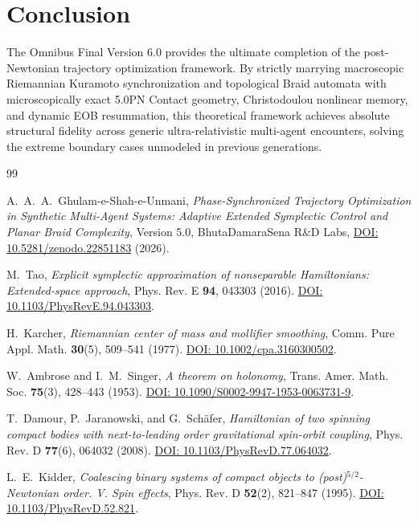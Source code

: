 \documentclass[11pt,a4paper,reqno]{article}
\theoremstyle{plain}
\theoremstyle{definition}
\theoremstyle{remark}
\numberwithin{equation}{section}
\begin{document}
\section*{Conclusion}
The Omnibus Final Version 6.0 provides the ultimate completion of the post-Newtonian trajectory optimization framework. By strictly marrying macroscopic Riemannian Kuramoto synchronization and topological Braid automata with microscopically exact 5.0PN Contact geometry, Christodoulou nonlinear memory, and dynamic EOB resummation, this theoretical framework achieves absolute structural fidelity across generic ultra-relativistic multi-agent encounters, solving the extreme boundary cases unmodeled in previous generations.

\vspace{2ex}
\begin{thebibliography}{99}

A.~A.~A.~Ghulam-e-Shah-e-Unmani, \textit{Phase-Synchronized Trajectory Optimization in Synthetic Multi-Agent Systems: Adaptive Extended Symplectic Control and Planar Braid Complexity}, Version 5.0, BhutaDamaraSena R\&D Labs, \href{https://doi.org/10.5281/zenodo.22851183}{DOI: 10.5281/zenodo.22851183} (2026).

M.~Tao, \textit{Explicit symplectic approximation of nonseparable Hamiltonians: Extended-space approach}, Phys. Rev. E \textbf{94}, 043303 (2016). \href{https://doi.org/10.1103/PhysRevE.94.043303}{DOI: 10.1103/PhysRevE.94.043303}.

H.~Karcher, \textit{Riemannian center of mass and mollifier smoothing}, Comm. Pure Appl. Math. \textbf{30}(5), 509--541 (1977). \href{https://doi.org/10.1002/cpa.3160300502}{DOI: 10.1002/cpa.3160300502}.

W.~Ambrose and I.~M.~Singer, \textit{A theorem on holonomy}, Trans. Amer. Math. Soc. \textbf{75}(3), 428--443 (1953). \href{https://doi.org/10.1090/S0002-9947-1953-0063731-9}{DOI: 10.1090/S0002-9947-1953-0063731-9}.

T.~Damour, P.~Jaranowski, and G.~Sch{\"a}fer, \textit{Hamiltonian of two spinning compact bodies with next-to-leading order gravitational spin-orbit coupling}, Phys. Rev. D \textbf{77}(6), 064032 (2008). \href{https://doi.org/10.1103/PhysRevD.77.064032}{DOI: 10.1103/PhysRevD.77.064032}.

L.~E.~Kidder, \textit{Coalescing binary systems of compact objects to (post)$^{5/2}$-Newtonian order. V. Spin effects}, Phys. Rev. D \textbf{52}(2), 821--847 (1995). \href{https://doi.org/10.1103/PhysRevD.52.821}{DOI: 10.1103/PhysRevD.52.821}.


\end{thebibliography}
\end{document}
